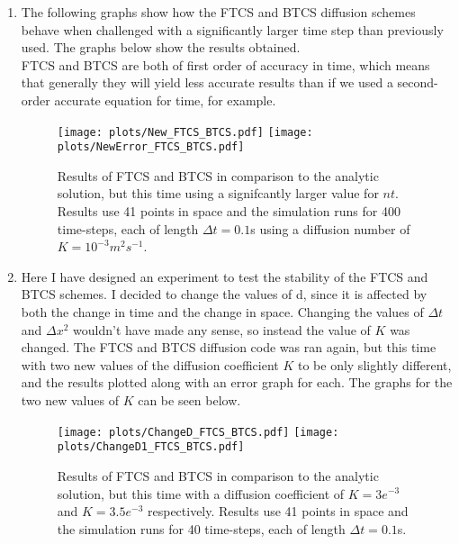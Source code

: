 \documentclass[12pt]{article}
\begin{document}
\begin{enumerate}
\item The following graphs show how the FTCS and BTCS diffusion schemes behave when challenged with a significantly larger time step than previously used. The graphs below show the results obtained. 
\\
FTCS and BTCS are both of first order of accuracy in time, which means that generally they will yield less accurate results than if we used a second-order accurate equation for time, for example. 

\begin{figure}[!htb]
\texttt{[image: plots/New\_FTCS\_BTCS.pdf]}
\texttt{[image: plots/NewError\_FTCS\_BTCS.pdf]}
\caption{Results of FTCS and BTCS in comparison to the analytic solution, but this time using a signifcantly larger value for $nt$. Results use 41 points in space and the simulation runs for 400 time-steps, each of length $\Delta t=0.1$s using a diffusion number of $K=10^{-3}m^{2}s^{-1}$. 
\label{fig:Q3}}
\end{figure}

\item Here I have designed an experiment to test the stability of the FTCS and BTCS schemes. I decided to change the values of d, since it is affected by both the change in time and the change in space. Changing the values of $\Delta t$ and $\Delta x^2$ wouldn't have made any sense, so instead the value of $K$ was changed. The FTCS and BTCS diffusion code was ran again, but this time with two new values of the diffusion coefficient $K$ to be only slightly different, and the results plotted along with an error graph for each. The graphs for the two new values of $K$ can be seen below.

\begin{figure}[!htb]
\texttt{[image: plots/ChangeD\_FTCS\_BTCS.pdf]}
\texttt{[image: plots/ChangeD1\_FTCS\_BTCS.pdf]}
\caption{Results of FTCS and BTCS in comparison to the analytic solution, but this time with a diffusion coefficient of $K = 3e^{-3}$ and $K = 3.5e^{-3}$ respectively. Results use 41 points in space and the simulation runs for 40 time-steps, each of length $\Delta t=0.1$s. 
\label{fig:Q4a}}
\end{figure}


\end{enumerate}
\end{document}
